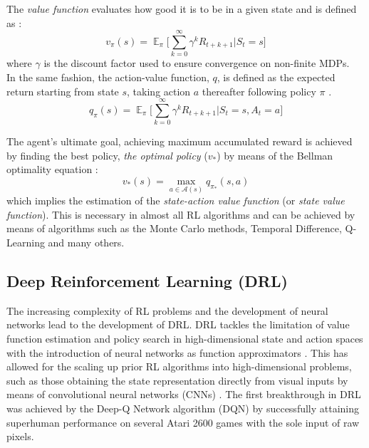 \documentclass{article}
\begin{document}
The \textit{value function} evaluates how good it is to be in a given state and is defined as \citep{Sutton1998ReinforcementIntroduction}:
\begin{equation}
    v_{\pi}(s)=\mathop{\mathbb{E}}_{\pi} \Big [ \sum_{k=0}^{\infty} \gamma^k R_{t+k+1} \big | S_{t}=s \Big]
\end{equation}
where $\gamma$ is the discount factor used to ensure convergence on non-finite MDPs.\\
In the same fashion, the action-value function, $q$, is defined as the expected return starting from state $s$, taking action $a$ thereafter following policy $\pi$ \cite{Sutton1998ReinforcementIntroduction}.
\begin{equation}
    q_{\pi}(s)=\mathop{\mathbb{E}}_{\pi} \Big [ \sum_{k=0}^{\infty} \gamma^k R_{t+k+1}\big | S_{t}=s ,A_{t}=a \Big ]
\end{equation}

The agent's ultimate goal, achieving maximum accumulated reward is achieved by finding the best policy, \textit{the optimal policy} ($v_{*}$) by means of the Bellman optimality equation \citep{Sutton1998ReinforcementIntroduction}:
\begin{equation}
    v_{*}(s)=\max_{a \in \mathcal{A}(s)} q_{\pi_{*}}(s,a)
\end{equation}
which implies the estimation of the \textit{state-action value function} (or \textit{state value function}). This is necessary in almost all RL algorithms and can be achieved by means of algorithms such as the Monte Carlo methods, Temporal Difference, Q-Learning and many others.
\subsection{Deep Reinforcement Learning (DRL)}
The increasing complexity of RL problems and the development of neural networks lead to the development of DRL. DRL tackles the limitation of value function estimation and policy search in high-dimensional state and action spaces with the introduction of neural networks as function approximators \citep{Arulkumaran2017ALearning}. This has allowed for the scaling up prior RL algorithms into high-dimensional problems, such as those obtaining the state representation directly from visual inputs by means of convolutional neural networks (CNNs) \citep{Arulkumaran2017ALearning}. The first breakthrough in DRL was achieved by the Deep-Q Network algorithm (DQN) \citep{MnihPlayingLearning} by successfully attaining superhuman performance on several Atari 2600 games with the sole input of raw pixels.
\end{document}
